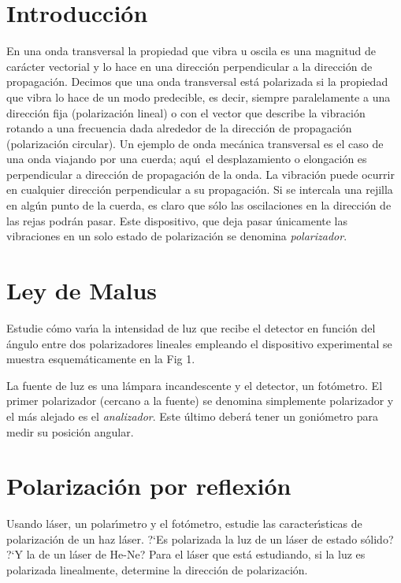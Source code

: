 \documentclass[epj]{svjour}
\begin{document}
\maketitle

\section{Introducci\'on}
En una onda transversal la propiedad que vibra u oscila es una magnitud de 
car\'acter vectorial y lo hace en una direcci\'on perpendicular a la 
direcci\'on de propagaci\'on. Decimos que una onda transversal est\'a 
polarizada si la propiedad que vibra lo hace de un modo predecible, es decir,
siempre paralelamente a una direcci\'on fija (polarizaci\'on lineal) o con el
vector que describe la vibraci\'on rotando a una frecuencia dada alrededor de
la direcci\'on de propagaci\'on (polarizaci\'on circular). Un ejemplo de onda
mec\'anica transversal es el caso de una onda viajando por una cuerda; aqu\'\i\
el desplazamiento o elongaci\'on es perpendicular a direcci\'on de 
propagaci\'on de la onda. La vibraci\'on puede ocurrir en cualquier direcci\'on
perpendicular a su propagaci\'on. Si se intercala una rejilla en alg\'un punto
de la cuerda, es claro que s\'olo las oscilaciones en la direcci\'on de las 
rejas podr\'an pasar. Este dispositivo, que deja pasar \'unicamente las 
vibraciones en un solo estado de polarizaci\'on se denomina {\it polarizador}.

\section{Ley de Malus}
Estudie c\'omo var\'\i a la intensidad de luz que recibe el detector en 
funci\'on del \'angulo entre dos polarizadores lineales empleando el 
dispositivo experimental se muestra esquem\'aticamente en la Fig 1.

La fuente de luz es una l\'ampara incandescente y el detector, un fot\'ometro.
El primer polarizador (cercano a la fuente) se denomina simplemente polarizador
y el m\'as alejado es el {\it analizador}. Este \'ultimo deber\'a tener un 
goni\'ometro para medir su posici\'on angular.

\section{Polarizaci\'on por reflexi\'on}

Usando l\'aser, un polar\'\i metro y el fot\'ometro, estudie las 
caracter\'\i sticas de polarizaci\'on de un haz l\'aser. ?`Es polarizada la
luz de un l\'aser de estado s\'olido? ?`Y la de un l\'aser de He-Ne? Para el
l\'aser que est\'a estudiando, si la luz es polarizada linealmente, determine
la direcci\'on de polarizaci\'on.
\end{document}
